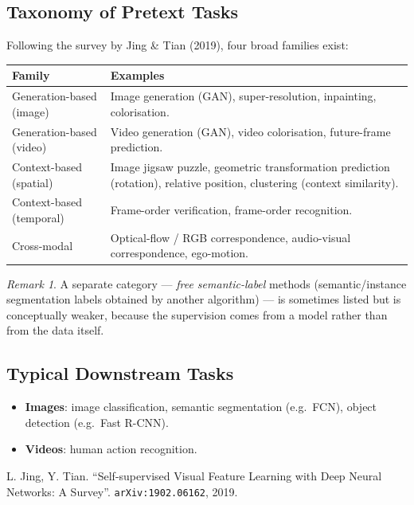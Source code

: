 \documentclass[11pt,a4paper]{article}
\theoremstyle{definition}
\theoremstyle{plain}
\theoremstyle{remark}
\newtheorem*{remark}{Remark}
\begin{document}
\subsection{Taxonomy of Pretext Tasks}

Following the survey by Jing \& Tian (2019), four broad families exist:

\begin{center}
\begin{tabular}{|l|p{8cm}|}
\hline
\textbf{Family} & \textbf{Examples} \\
\hline
Generation-based (image) & Image generation (GAN), super-resolution, inpainting, colorisation. \\
\hline
Generation-based (video) & Video generation (GAN), video colorisation, future-frame prediction. \\
\hline
Context-based (spatial) & Image jigsaw puzzle, geometric transformation prediction (rotation), relative position, clustering (context similarity). \\
\hline
Context-based (temporal) & Frame-order verification, frame-order recognition. \\
\hline
Cross-modal & Optical-flow / RGB correspondence, audio-visual correspondence, ego-motion. \\
\hline
\end{tabular}
\end{center}

\begin{remark}
A separate category --- \emph{free semantic-label} methods (semantic/instance segmentation labels obtained by another algorithm) --- is sometimes listed but is conceptually weaker, because the supervision comes from a model rather than from the data itself.
\end{remark}

\subsection{Typical Downstream Tasks}

\begin{itemize}
    \item \textbf{Images}: image classification, semantic segmentation (e.g.\ FCN), object detection (e.g.\ Fast R-CNN).
    \item \textbf{Videos}: human action recognition.
\end{itemize}

\begin{tcolorbox}[colback=blue!5!white,colframe=blue!60!black,title={Reference}]
L. Jing, Y. Tian. ``Self-supervised Visual Feature Learning with Deep Neural Networks: A Survey''. \texttt{arXiv:1902.06162}, 2019.
\end{tcolorbox}
\end{document}
